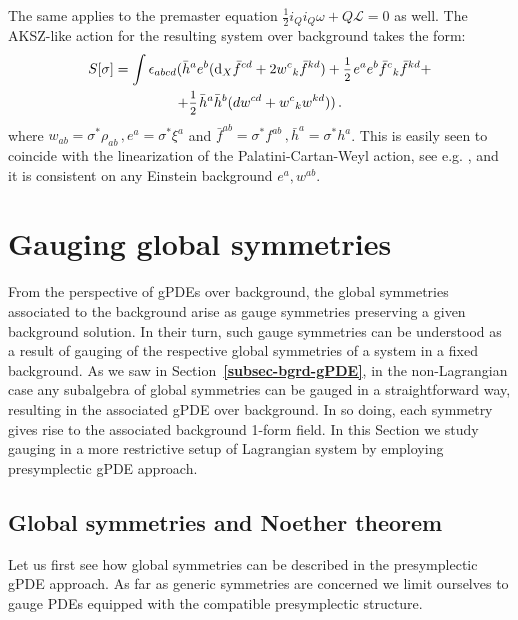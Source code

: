 \documentclass[a4paper,12pt]{article}
\numberwithin{equation}{section} %
\newcommand{\bref}[1]{\textbf{\ref{#1}}}
\newcommand{\dx}{\mathrm{d}_X}
\newcommand{\half}{\mathchoice{%
    \ffrac{1}{2}}{\frac{1}{2}}{\frac{1}{2}}{\frac{1}{2}}}
\newcommand{\ffrac}[2]{\raisebox{.5pt}%
  {\footnotesize$\displaystyle\frac{#1}{#2}$}\kern1pt}
\def\cL{\mathcal{L}}
\newcommand{\lorcon}{w}
\begin{document}
The same applies to the premaster equation $\frac{1}{2}i_Q i_Q \omega + Q\cL = 0$ as well. The AKSZ-like action for the resulting system over background takes the form: 
\begin{equation}
\begin{gathered}
    S[\sigma] = \int \epsilon_{abcd}(\bar{h}^{a} e^b (\dx \bar{f}^{cd} + 2\lorcon^c{ }_k \bar{f}^{kd})  + \half e^a e^b \bar{f}^{c}{ }_k \bar{f}^{kd} + \\ + \half \bar{h}^a \bar{h}^b (d\lorcon^{cd} + \lorcon^c{ }_k \lorcon^{kd}))\,.
\end{gathered}
\end{equation}
where $\lorcon_{ab} = \sigma^*\rho_{ab}\,, e^a = \sigma^* \xi^a$ and $\bar{f}^{ab} = \sigma^* f^{ab}\,, \bar{h}^a = \sigma^* h^a$.
This is easily seen to coincide with the linearization of the Palatini-Cartan-Weyl action, see e.g. \cite{Vasiliev:1980as, Zinoviev:2003ix}, and it is consistent on any Einstein background $e^a, \lorcon^{ab}$. 



\section{Gauging global symmetries}

From the perspective of gPDEs over background, the global symmetries associated to the background arise as gauge symmetries preserving a given background solution. In their turn, such gauge symmetries can be understood as a result of gauging of the respective global symmetries of a system in a fixed background. As we saw in Section~\bref{subsec-bgrd-gPDE}, in the non-Lagrangian case any subalgebra of global symmetries can be gauged in a straightforward way, resulting in the associated gPDE over background. In so doing, each symmetry gives rise to the associated background 1-form field. In this Section we study gauging in a more restrictive setup of Lagrangian system by employing presymplectic gPDE approach.  
 

\subsection{Global symmetries and Noether theorem}
Let us first see how global symmetries can be described in the presymplectic gPDE approach. As far as generic symmetries are concerned we limit ourselves to gauge PDEs equipped with the compatible presymplectic structure.
\end{document}
